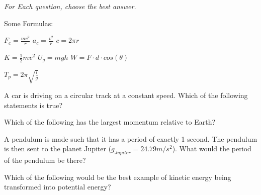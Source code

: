 \documentclass[12pt]{examdesign}
\begin{document}
\begin{multiplechoice} [title={Multiple Choice},
	rearrange=no]
	
	\textit{For Each question, choose the best answer.}
	
	
	Some Formulas: 
	\begin{center}
		$F_c = \frac{mv^2}{r} $	\hspace{1 in} $a_c = \frac{v^2}{r}$ \hspace{1in} $c = 2 \pi r 
		$
		
			\vspace{0.2 cm}	
			
		$	K = \frac{1}{2}mv^2	$ \hspace{1 in} $U_g = mgh$ \hspace{1 in} $W = F \cdot  d \cdot cos (\theta)$
			\vspace{0.2 cm}	
			
			$T_p = 2\pi \sqrt{\frac{l}{g}}$ 
		\vspace{0.1in}
	\end{center}	
	
\begin{question}
	A car is driving on a circular track at a constant speed.  Which of the following statements is true?
	
\end{question}


\begin{question}
	Which of the following has the largest momentum relative to Earth?
\end{question}


\begin{question}
	A pendulum is made such that it has a period of exactly 1 second.  The pendulum is then sent to the planet Jupiter ($g_{Jupiter} = 24.79 m/s^2$).  What would the period of the pendulum be there?
\end{question}

\begin{question}
	Which of the following would be the best example of kinetic energy being transformed into potential energy?
\end{question}



\end{multiplechoice}
\end{document}

